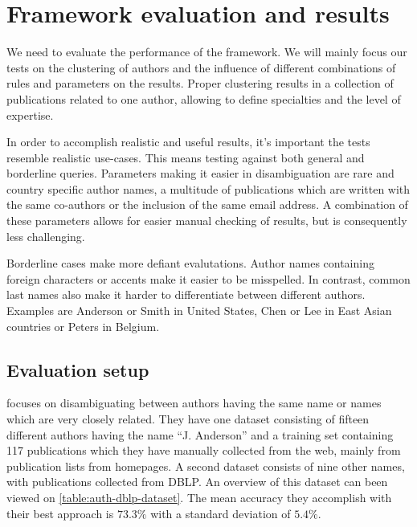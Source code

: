 \chapter{Framework evaluation and results}

We need to evaluate the performance of the framework. We will mainly focus our tests on the clustering of authors and the influence of different combinations of rules and parameters on the results. Proper clustering results in a collection of publications related to one author, allowing to define specialties and the level of expertise. 

In order to accomplish realistic and useful results, it's important the tests resemble realistic use-cases. This means testing against both general and borderline queries. Parameters making it easier in disambiguation are rare and country specific author names, a multitude of publications which are written with the same co-authors or the inclusion of the same email address. A combination of these parameters allows for easier manual checking of results, but is consequently less challenging. 

Borderline cases make more defiant evalutations. Author names containing foreign characters or accents make it easier to be misspelled. In contrast, common last names also make it harder to differentiate between different authors. Examples are Anderson or Smith in United States, Chen or Lee in East Asian countries or Peters in Belgium.




\section{Evaluation setup}

\cite{han2004two} focuses on disambiguating between authors having the same name or names which are very closely related. They have one dataset consisting of fifteen different authors having the name "`J. Anderson"' and a training set containing 117 publications which they have manually collected from the web, mainly from publication lists from homepages. A second dataset consists of nine other names, with publications collected from DBLP. An overview of this dataset can been viewed on \autoref{table:auth-dblp-dataset}. The mean accuracy they accomplish with their best approach is $73.3\%$ with a standard deviation of $5.4\%$.

